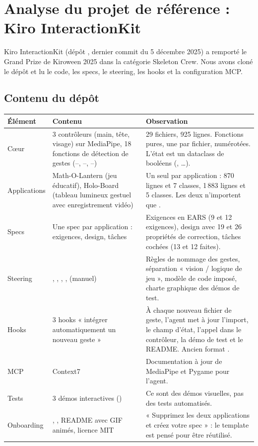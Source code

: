 \section{Analyse du projet de référence : Kiro InteractionKit}

Kiro InteractionKit (dépôt , dernier commit du 5 décembre 2025) a remporté le Grand Prize de Kiroween 2025 dans la catégorie Skeleton Crew. Nous avons cloné le dépôt et lu le code, les specs, le steering, les hooks et la configuration MCP.

\subsection{Contenu du dépôt}

\begin{xltabular}{\textwidth}{@{}L{3.6cm}L{4.4cm}Y@{}}
\toprule
\textbf{Élément} & \textbf{Contenu} & \textbf{Observation} \\
\midrule
Cœur  & 3 contrôleurs (main, tête, visage) sur MediaPipe, 18 fonctions de détection de gestes (--, --, --) & 29 fichiers, 925 lignes. Fonctions pures, une par fichier, numérotées. L'état est un dataclass de booléens (, \dots). \\
Applications  & Math-O-Lantern (jeu éducatif), Holo-Board (tableau lumineux gestuel avec enregistrement vidéo) & Un seul  par application : 870 lignes et 7 classes, 1\,883 lignes et 5 classes. Les deux n'importent que . \\
Specs  & Une spec par application : exigences, design, tâches & Exigences en EARS (9 et 12 exigences), design avec 19 et 26 propriétés de correction, tâches cochées (13 et 12 faites). \\
Steering  & , , , ,  (manuel) & Règles de nommage des gestes, séparation « vision / logique de jeu », modèle de code imposé, charte graphique des démos de test. \\
Hooks  & 3 hooks « intégrer automatiquement un nouveau geste » & À chaque nouveau fichier de geste, l'agent met à jour l'import, le champ d'état, l'appel dans le contrôleur, la démo de test et le README. Ancien format . \\
MCP  & Context7 & Documentation à jour de MediaPipe et Pygame pour l'agent. \\
Tests  & 3 démos interactives () & Ce sont des démos visuelles, pas des tests automatisés. \\
Onboarding & , , README avec GIF animés, licence MIT & « Supprimez les deux applications et créez votre spec » : le template est pensé pour être réutilisé. \\
\bottomrule
\end{xltabular}

